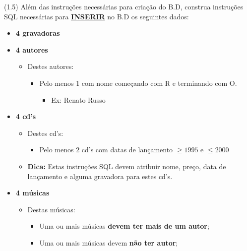 \documentclass[12pt]{exam}
\begin{document}
\begin{questions}

\question (1.5) Além das instruções necessárias para criação do B.D, construa instruções SQL necessárias para \textbf{\underline{INSERIR}} no B.D os seguintes dados:

\begin{itemize}
    \item \textbf{4 gravadoras}
    \item \textbf{4 autores}
    \begin{itemize}
        \item Destes autores:
        \begin{itemize}
            \item Pelo menos 1 com nome começando com R e terminando com O. 
            \begin{itemize}
                \item Ex: Renato Russo
            \end{itemize}
        \end{itemize}
    \end{itemize}
    \item \textbf{4 cd's}
    \begin{itemize}
        \item Destes cd's:
        \begin{itemize}
            \item Pelo menos 2 cd's com datas de lançamento $\geq 1995$ e $\leq 2000$
        \end{itemize}
         \item \textbf{Dica:} Estas instruções SQL devem atribuir nome, preço, data de lançamento e alguma gravadora para estes cd's.
    \end{itemize}
    \item \textbf{4 músicas}
        \begin{itemize}
            \item Destas músicas:
            \begin{itemize}
                \item Uma ou mais músicas \textbf{devem ter mais de um autor};
                \item Uma ou mais músicas devem \textbf{não ter autor};

\end{itemize}
\end{itemize}
\end{itemize}
\end{questions}
\end{document}
